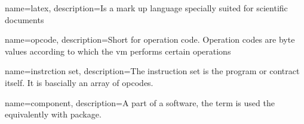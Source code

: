 \makeglossaries

{
        name=latex,
        description={Is a mark up language specially suited for
scientific documents}
}


{
        name=opcode,
        description={Short for operation code. Operation codes are byte values according to which the vm performs certain operations}
}

{
        name=instrction set,
        description={The instruction set is the program or contract itself. It is bascially an array of opcodes.}
}

{
        name=component,
        description={A part of a software, the term is used the equivalently with package.}
}
